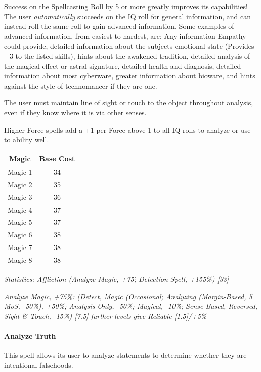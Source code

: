 \begin{multicols*}{3}
	Success on the Spellcasting Roll by 5 or more greatly improves its capabilities! The user \textit{automatically} succeeds on the IQ roll for general information, and can instead roll the same roll to gain advanced information. Some examples of advanced information, from easiest to hardest, are: Any information Empathy could provide, detailed information about the subjects emotional state (Provides +3 to the listed skills), hints about the awakened tradition, detailed analysis of the magical effect or astral signature, detailed health and diagnosis, detailed information about most cyberware, greater information about bioware, and hints against the style of technomancer if they are one.
	
	The user must maintain line of sight or touch to the object throughout analysis, even if they know where it is via other senses.
	
	Higher Force spells add a +1 per Force above 1 to all IQ rolls to analyze or use to ability well.
	
	\begin{center}
		\begin{tabular}{|c|c|}
			\hline
			Magic & Base Cost \\
			\hline
			\hline
			Magic 1 & 34 \\
			Magic 2 & 35 \\
			Magic 3 & 36 \\
			Magic 4 & 37 \\
			Magic 5 & 37 \\
			Magic 6 & 38 \\
			Magic 7 & 38 \\
			Magic 8 & 38 \\
			\hline
		\end{tabular}
	\end{center}
	
	\textcolor{OliveGreen}{\textit{ Statistics: Affliction (Analyze Magic, +75\^; Detection Spell, +155\%) [33]}}
	
	\textcolor{OliveGreen}{\textit{Analyze Magic, +75\%: (Detect, Magic (Occasional; Analyzing (Margin-Based, 5 MoS, -50\%), +50\%; Analysis Only, -50\%; Magical, -10\%; Sense-Based, Reversed, Sight \& Touch, -15\%) [7.5] further levels give Reliable [1.5]/+5\%}}
	
	\paragraph{Analyze Truth}
	
	This spell allows its user to analyze statements to determine whether they are intentional falsehoods.
	

\end{multicols*}
